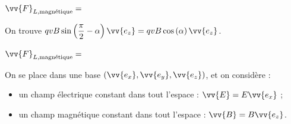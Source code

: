 \begin{enonce}
$\vv{F}_{L,\text{magnétique}}=$
\end{enonce}

%

\begin{corrige}
On trouve $qvB\sin\left(\dfrac{\pi}{2}-\alpha\right)\vv{e_{z}}=qvB\cos\left(\alpha\right)\vv{e_{z}}$. 
\end{corrige}



\begin{enonce}
$\vv{F}_{L,\text{magnétique}}=$
\end{enonce}





\finEntrainement










\hauteurLargeurCadreReponse		{8mm}{4.2cm}
\typeEntrainement				{} %
\initialisationEntrainement


On se place dans une base $\left(\vv{e_{x}},\vv{e_{y}},\vv{e_{z}}\right)$, et on considère :
\begin{itemize}
\item
un champ électrique constant dans tout l'espace : $\vv{E}=E\vv{e_{x}}$ ;%
\item
un champ magnétique  constant dans tout l'espace : $\vv{B}=B\vv{e_{z}}$.
\end{itemize}

